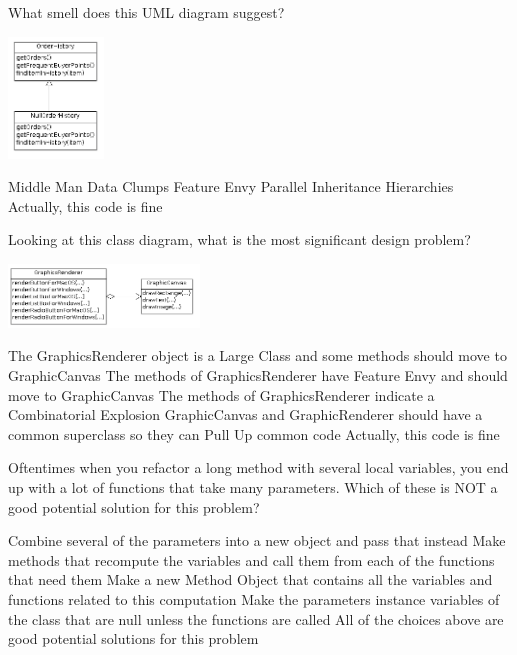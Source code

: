 \documentclass{exam}
\begin{document}
\begin{questions}
\question What smell does this UML diagram suggest?

\includegraphics[width=1in]{NullObject.png}

\begin{choices}
\choice Middle Man
\choice Data Clumps
\choice Feature Envy
\choice Parallel Inheritance Hierarchies
\correctchoice Actually, this code is fine
\end{choices}

\question[1] Looking at this class diagram, what is the most significant design problem?

\includegraphics[width=2in]{methodCE.png}

\begin{choices}
\choice The GraphicsRenderer object is a Large Class and some methods should move to GraphicCanvas
\choice The methods of GraphicsRenderer have Feature Envy and should move to GraphicCanvas
\correctchoice The methods of GraphicsRenderer indicate a Combinatorial Explosion
\choice GraphicCanvas and GraphicRenderer should have a common superclass so they can Pull Up common code
\choice Actually, this code is fine
\end{choices}

\question[1] Oftentimes when you refactor a long method with several local variables, you end up with a lot of functions that take many parameters.  Which of these is NOT a good potential solution for this problem?

\begin{choices}
\choice Combine several of the parameters into a new object and pass that instead
\choice Make methods that recompute the variables and call them from each of the functions that need them
\choice Make a new Method Object that contains all the variables and functions related to this computation
\correctchoice Make the parameters instance variables of the class that are null unless the functions are called
\choice All of the choices above are good potential solutions for this problem
\end{choices}


\end{questions}
\end{document}
